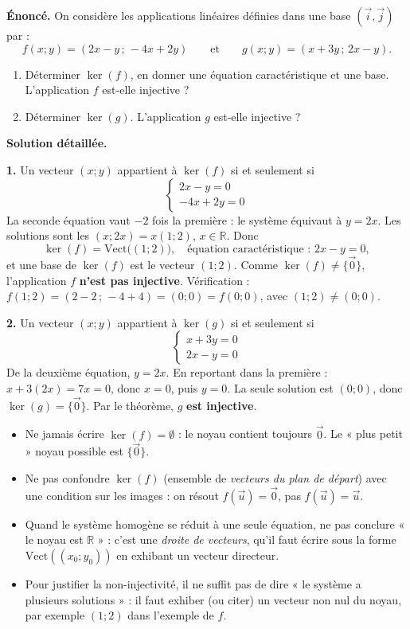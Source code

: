 \documentclass[11pt]{article}
\begin{document}
\begin{exoresolu}
\textbf{Énoncé.} On considère les applications linéaires définies dans une base $(\vec{i}, \vec{j})$ par :
\[
f(x ; y) = (2x - y \,;\, -4x + 2y) \qquad \text{et} \qquad g(x ; y) = (x + 3y \,;\, 2x - y).
\]
\begin{enumerate}
\item Déterminer $\ker(f)$, en donner une équation caractéristique et une base. L'application $f$ est-elle injective ?
\item Déterminer $\ker(g)$. L'application $g$ est-elle injective ?
\end{enumerate}
\tcblower
\textbf{Solution détaillée.}

\textbf{1.} Un vecteur $(x ; y)$ appartient à $\ker(f)$ si et seulement si
\[
\begin{cases} 2x - y = 0 \\ -4x + 2y = 0 \end{cases}
\]
La seconde équation vaut $-2$ fois la première : le système équivaut à $y = 2x$. Les solutions sont les $(x ; 2x) = x(1 ; 2)$, $x \in \mathbb{R}$. Donc
\[
\ker(f) = \mathrm{Vect}\big((1 ; 2)\big), \quad \text{équation caractéristique : } 2x - y = 0,
\]
et une base de $\ker(f)$ est le vecteur $(1 ; 2)$. Comme $\ker(f) \neq \{\vec{0}\}$, l'application $f$ \textbf{n'est pas injective}. Vérification : $f(1 ; 2) = (2 - 2 \,;\, -4 + 4) = (0 ; 0) = f(0 ; 0)$, avec $(1 ; 2) \neq (0 ; 0)$.

\textbf{2.} Un vecteur $(x ; y)$ appartient à $\ker(g)$ si et seulement si
\[
\begin{cases} x + 3y = 0 \\ 2x - y = 0 \end{cases}
\]
De la deuxième équation, $y = 2x$. En reportant dans la première : $x + 3(2x) = 7x = 0$, donc $x = 0$, puis $y = 0$. La seule solution est $(0 ; 0)$, donc $\ker(g) = \{\vec{0}\}$. Par le théorème, $g$ \textbf{est injective}.
\end{exoresolu}

\begin{attention}
\begin{itemize}
\item Ne jamais écrire $\ker(f) = \emptyset$ : le noyau contient toujours $\vec{0}$. Le « plus petit » noyau possible est $\{\vec{0}\}$.
\item Ne pas confondre $\ker(f)$ (ensemble de \emph{vecteurs du plan de départ}) avec une condition sur les images : on résout $f(\vec{u}) = \vec{0}$, pas $f(\vec{u}) = \vec{u}$.
\item Quand le système homogène se réduit à une seule équation, ne pas conclure « le noyau est $\mathbb{R}$ » : c'est une \emph{droite de vecteurs}, qu'il faut écrire sous la forme $\mathrm{Vect}((x_0 ; y_0))$ en exhibant un vecteur directeur.
\item Pour justifier la non-injectivité, il ne suffit pas de dire « le système a plusieurs solutions » : il faut exhiber (ou citer) un vecteur non nul du noyau, par exemple $(1 ; 2)$ dans l'exemple de $f$.
\end{itemize}
\end{attention}
\end{document}
